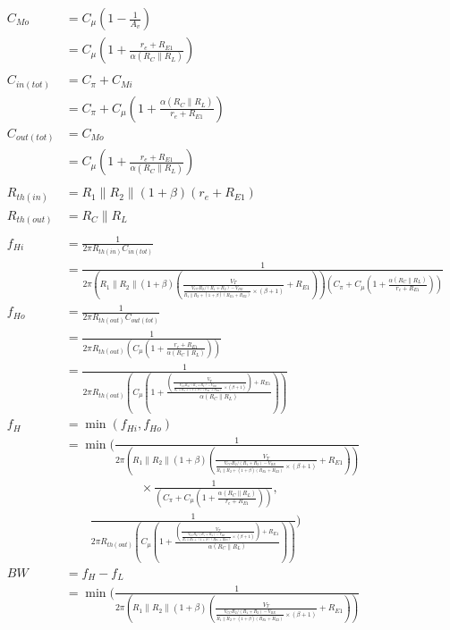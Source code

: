 \documentclass[11pt, a4paper]{article}
\begin{document}
\begin{align*}
C_{Mo} &= C_\mu \left(1 - \frac{1}{A_v}\right)\\
&= C_\mu \left(1 + \frac{r_e + R_{E1}}{\alpha(R_C \parallel R_L)}\right)\\ \\
C_{in(tot)} &= C_\pi + C_{Mi}\\
&= C_\pi + C_\mu \left(1 + \frac{\alpha(R_C \parallel R_L)}{r_e + R_{E1}}\right)\\
C_{out(tot)} &= C_{Mo}\\
&= C_\mu \left(1 + \frac{r_e + R_{E1}}{\alpha(R_C \parallel R_L)}\right)\\ \\
R_{th(in)} &= R_1 \parallel R_2 \parallel (1+\beta)(r_e + R_{E1})\\
R_{th(out)} &= R_C \parallel R_L\\ \\
f_{Hi} &= \frac{1}{2\pi R_{th(in)} C_{in(tot)}}\\
&= \frac{1}{2\pi (R_1 \parallel R_2 \parallel (1+\beta)(\frac{V_T}{\frac{V_{CC}R_2/(R_1+R_2)-V_{BE}}{R_1 \parallel R_2 + (1+\beta)(R_{E1}+R_{E2})} \times (\beta + 1)} + R_{E1})) (C_\pi + C_\mu \left(1 + \frac{\alpha(R_C \parallel R_L)}{r_e + R_{E1}}\right))}\\
f_{Ho} &= \frac{1}{2\pi R_{th(out)} C_{out(tot)}}\\
&= \frac{1}{2\pi R_{th(out)} (C_\mu \left(1 + \frac{r_e + R_{E1}}{\alpha(R_C \parallel R_L)}\right))}\\
&= \frac{1}{2\pi R_{th(out)} (C_\mu \left(1 + \frac{(\frac{V_T}{\frac{V_{CC}R_2/(R_1+R_2)-V_{BE}}{R_1 \parallel R_2 + (1+\beta)(R_{E1}+R_{E2})} \times (\beta + 1)}) + R_{E1}}{\alpha(R_C \parallel R_L)}\right))}\\
f_H &= \min(f_{Hi}, f_{Ho})\\
&= \min\Bigg(
    \frac{1}{2\pi (R_1 \parallel R_2 \parallel (1+\beta)(\frac{V_T}{\frac{V_{CC}R_2/(R_1+R_2)-V_{BE}}{R_1 \parallel R_2 + (1+\beta)(R_{E1}+R_{E2})} \times (\beta + 1)} + R_{E1}))} \\
&\qquad\qquad\qquad \times \frac{1}{(C_\pi + C_\mu \left(1 + \frac{\alpha(R_C \parallel R_L)}{r_e + R_{E1}}\right))}, \\
&\qquad \frac{1}{2\pi R_{th(out)} (C_\mu \left(1 + \frac{(\frac{V_T}{\frac{V_{CC}R_2/(R_1+R_2)-V_{BE}}{R_1 \parallel R_2 + (1+\beta)(R_{E1}+R_{E2})} \times (\beta + 1)}) + R_{E1}}{\alpha(R_C \parallel R_L)}\right))}
\Bigg)\\
BW &= f_H - f_L\\
& = \min\Bigg(
    \frac{1}{2\pi (R_1 \parallel R_2 \parallel (1+\beta)(\frac{V_T}{\frac{V_{CC}R_2/(R_1+R_2)-V_{BE}}{R_1 \parallel R_2 + (1+\beta)(R_{E1}+R_{E2})} \times (\beta + 1)} + R_{E1}))} \\

\end{align*}
\end{document}
